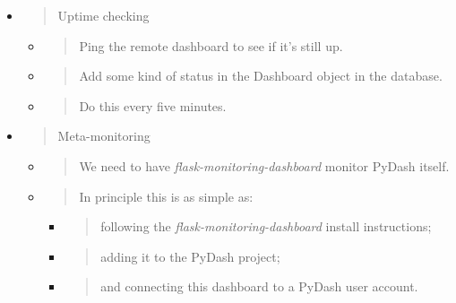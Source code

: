 \begin{itemize}
\item
  \begin{quote}
  Uptime checking
  \end{quote}

  \begin{itemize}
  \item
    \begin{quote}
    Ping the remote dashboard to see if it's still up.
    \end{quote}
  \item
    \begin{quote}
    Add some kind of status in the Dashboard object in the database.
    \end{quote}
  \item
    \begin{quote}
    Do this every five minutes.
    \end{quote}
  \end{itemize}
\item
  \begin{quote}
  Meta-monitoring
  \end{quote}

  \begin{itemize}
  \item
    \begin{quote}
    We need to have \emph{flask-monitoring-dashboard} monitor PyDash
    itself.
    \end{quote}
  \item
    \begin{quote}
    In principle this is as simple as:
    \end{quote}

    \begin{itemize}
    \item
      \begin{quote}
      following the \emph{flask-monitoring-dashboard} install
      instructions;
      \end{quote}
    \item
      \begin{quote}
      adding it to the PyDash project;
      \end{quote}
    \item
      \begin{quote}
      and connecting this dashboard to a PyDash user account.
      \end{quote}
    \end{itemize}
  \end{itemize}
\end{itemize}

